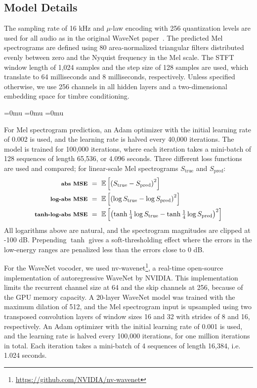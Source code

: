 \subsection{Model Details}

The sampling rate of 16 kHz and $\mu$-law encoding with 256 quantization levels are used for all audio as in the original WaveNet paper~\cite{oord2016wavenet}.
The predicted Mel spectrograms are defined using 80 area-normalized triangular filters distributed evenly between zero and the Nyquist frequency in the Mel scale.
The STFT window length of 1,024 samples and the step size of 128 samples are used, which translate to 64 milliseconds and 8 milliseconds, respectively.
Unless specified otherwise, we use 256 channels in all hidden layers and a two-dimensional embedding space for timbre conditioning.

\medmuskip=0mu
\thinmuskip=0mu
\thickmuskip=0mu

For Mel spectrogram prediction, an Adam optimizer with the initial learning rate of 0.002 is used, and the learning rate is halved every 40,000 iterations.
The model is trained for 100,000 iterations, where each iteration takes a mini-batch of 128 sequences of length 65,536, or 4.096 seconds.
Three different loss functions are used and compared; for linear-scale Mel spectrograms $S_{\mathrm{true}}$ and $S_{\mathrm{pred}}$:
\begin{align}
\footnotesize \textbf{abs MSE} & ~=~ \mathbb{E} \left [ \left ( S_{\mathrm{true}} - S_{\mathrm{pred}} \right )^2 \right ]
\label{eqn:abs-loss} \\
\footnotesize \textbf{log-abs MSE} & ~=~ \mathbb{E} \left [ \left ( \log S_{\mathrm{true}} - \log S_{\mathrm{pred}} \right )^2 \right ]
\label{eqn:log-abs-loss} \\
\footnotesize \textbf{tanh-log-abs MSE} & ~=~ \mathbb{E} \left [ \left ( \tanh \tfrac{1}{4}\log S_{\mathrm{true}} - \tanh \tfrac{1}{4}\log S_{\mathrm{pred}}  \right )^2 \right ]
\label{eqn:tanh-log-abs-loss}
\end{align}
\noindent All logarithms above are natural, and the spectrogram magnitudes are clipped at -100 dB. Prepending $\tanh$ gives a soft-thresholding effect where the errors in the low-energy ranges are penalized less than the errors close to 0 dB.

For the WaveNet vocoder, we used nv-wavenet\footnote{\url{https://github.com/NVIDIA/nv-wavenet}}, a real-time open-source implementation of autoregressive WaveNet by NVIDIA.
This implementation limits the recurrent channel size at 64 and the skip channels at 256, because of the GPU memory capacity.
A 20-layer WaveNet model was trained with the maximum dilation of 512, and the Mel spectrogram input is upsampled using two transposed convolution layers of window sizes 16 and 32 with strides of 8 and 16, respectively.
An Adam optimizer with the initial learning rate of 0.001 is used, and the learning rate is halved every 100,000 iterations, for one million iterations in total.
Each iteration takes a mini-batch of 4 sequences of length 16,384, i.e. 1.024 seconds.

